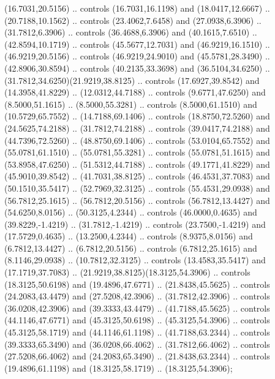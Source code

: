 \begin{scope}[y=0.80pt, x=0.80pt, yscale=-1.000000, xscale=1.000000, inner sep=0pt, outer sep=0pt]
\begin{scope}[shift={(17.85289,223.21522)},xscale=0.100,yscale=-0.100]
              (16.7031,20.5156) .. controls (16.7031,16.1198) and (18.0417,12.6667) ..
              (20.7188,10.1562) .. controls (23.4062,7.6458) and (27.0938,6.3906) ..
              (31.7812,6.3906) .. controls (36.4688,6.3906) and (40.1615,7.6510) ..
              (42.8594,10.1719) .. controls (45.5677,12.7031) and (46.9219,16.1510) ..
              (46.9219,20.5156) .. controls (46.9219,24.9010) and (45.5781,28.3490) ..
              (42.8906,30.8594) .. controls (40.2135,33.3698) and (36.5104,34.6250) ..
              (31.7812,34.6250)(21.9219,38.8125) .. controls (17.6927,39.8542) and
              (14.3958,41.8229) .. (12.0312,44.7188) .. controls (9.6771,47.6250) and
              (8.5000,51.1615) .. (8.5000,55.3281) .. controls (8.5000,61.1510) and
              (10.5729,65.7552) .. (14.7188,69.1406) .. controls (18.8750,72.5260) and
              (24.5625,74.2188) .. (31.7812,74.2188) .. controls (39.0417,74.2188) and
              (44.7396,72.5260) .. (48.8750,69.1406) .. controls (53.0104,65.7552) and
              (55.0781,61.1510) .. (55.0781,55.3281) .. controls (55.0781,51.1615) and
              (53.8958,47.6250) .. (51.5312,44.7188) .. controls (49.1771,41.8229) and
              (45.9010,39.8542) .. (41.7031,38.8125) .. controls (46.4531,37.7083) and
              (50.1510,35.5417) .. (52.7969,32.3125) .. controls (55.4531,29.0938) and
              (56.7812,25.1615) .. (56.7812,20.5156) .. controls (56.7812,13.4427) and
              (54.6250,8.0156) .. (50.3125,4.2344) .. controls (46.0000,0.4635) and
              (39.8229,-1.4219) .. (31.7812,-1.4219) .. controls (23.7500,-1.4219) and
              (17.5729,0.4635) .. (13.2500,4.2344) .. controls (8.9375,8.0156) and
              (6.7812,13.4427) .. (6.7812,20.5156) .. controls (6.7812,25.1615) and
              (8.1146,29.0938) .. (10.7812,32.3125) .. controls (13.4583,35.5417) and
              (17.1719,37.7083) .. (21.9219,38.8125)(18.3125,54.3906) .. controls
              (18.3125,50.6198) and (19.4896,47.6771) .. (21.8438,45.5625) .. controls
              (24.2083,43.4479) and (27.5208,42.3906) .. (31.7812,42.3906) .. controls
              (36.0208,42.3906) and (39.3333,43.4479) .. (41.7188,45.5625) .. controls
              (44.1146,47.6771) and (45.3125,50.6198) .. (45.3125,54.3906) .. controls
              (45.3125,58.1719) and (44.1146,61.1198) .. (41.7188,63.2344) .. controls
              (39.3333,65.3490) and (36.0208,66.4062) .. (31.7812,66.4062) .. controls
              (27.5208,66.4062) and (24.2083,65.3490) .. (21.8438,63.2344) .. controls
              (19.4896,61.1198) and (18.3125,58.1719) .. (18.3125,54.3906);

\end{scope}
\end{scope}
